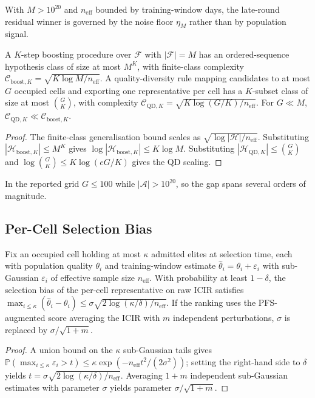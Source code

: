 With $M>10^{20}$ and $n_{\mathrm{eff}}$ bounded by training-window days, the late-round residual winner is governed by the noise floor $\eta_M$ rather than by population signal.

\begin{theorem}
\label{app:thm_complexity}
A $K$-step boosting procedure over $\mathcal{F}$ with $|\mathcal{F}|=M$ has an ordered-sequence hypothesis class of size at most $M^K$, with finite-class complexity $\mathcal{C}_{\mathrm{boost},K}=\sqrt{K\log M/n_{\mathrm{eff}}}$. A quality-diversity rule mapping candidates to at most $G$ occupied cells and exporting one representative per cell has a $K$-subset class of size at most $\binom{G}{K}$, with complexity $\mathcal{C}_{\mathrm{QD},K}=\sqrt{K\log(G/K)/n_{\mathrm{eff}}}$. For $G\ll M$, $\mathcal{C}_{\mathrm{QD},K}\ll\mathcal{C}_{\mathrm{boost},K}$.
\end{theorem}
\begin{proof}
The finite-class generalisation bound scales as $\sqrt{\log|\mathcal{H}|/n_{\mathrm{eff}}}$. Substituting $|\mathcal{H}_{\mathrm{boost},K}|\le M^K$ gives $\log|\mathcal{H}_{\mathrm{boost},K}|\le K\log M$. Substituting $|\mathcal{H}_{\mathrm{QD},K}|\le\binom{G}{K}$ and $\log\binom{G}{K}\le K\log(eG/K)$ gives the QD scaling.
\end{proof}

In the reported grid $G\le 100$ while $|\mathcal{A}|>10^{20}$, so the gap spans several orders of magnitude.

\subsection{Per-Cell Selection Bias}
\label{app:alphaqd_selection}

\begin{theorem}
\label{app:thm_selection}
Fix an occupied cell holding at most $\kappa$ admitted elites at selection time, each with population quality $\theta_i$ and training-window estimate $\hat\theta_i=\theta_i+\varepsilon_i$ with sub-Gaussian $\varepsilon_i$ of effective sample size $n_{\mathrm{eff}}$. With probability at least $1-\delta$, the selection bias of the per-cell representative on raw ICIR satisfies $\max_{i\le\kappa}(\hat\theta_i-\theta_i)\le\sigma\sqrt{2\log(\kappa/\delta)/n_{\mathrm{eff}}}$. If the ranking uses the PFS-augmented score averaging the ICIR with $m$ independent perturbations, $\sigma$ is replaced by $\sigma/\sqrt{1+m}$.
\end{theorem}
\begin{proof}
A union bound on the $\kappa$ sub-Gaussian tails gives $\mathbb{P}(\max_{i\le\kappa}\varepsilon_i>t)\le\kappa\exp(-n_{\mathrm{eff}}t^2/(2\sigma^2))$; setting the right-hand side to $\delta$ yields $t=\sigma\sqrt{2\log(\kappa/\delta)/n_{\mathrm{eff}}}$. Averaging $1+m$ independent sub-Gaussian estimates with parameter $\sigma$ yields parameter $\sigma/\sqrt{1+m}$.
\end{proof}

